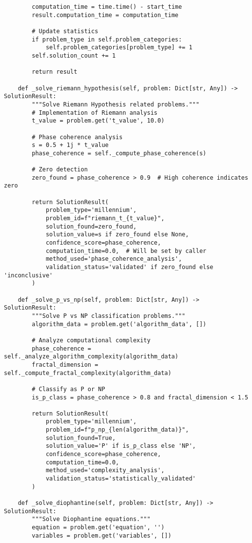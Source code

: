 \documentclass[12pt]{article}
\begin{document}
\begin{lstlisting}
        computation_time = time.time() - start_time
        result.computation_time = computation_time

        # Update statistics
        if problem_type in self.problem_categories:
            self.problem_categories[problem_type] += 1
        self.solution_count += 1

        return result

    def _solve_riemann_hypothesis(self, problem: Dict[str, Any]) -> SolutionResult:
        """Solve Riemann Hypothesis related problems."""
        # Implementation of Riemann analysis
        t_value = problem.get('t_value', 10.0)

        # Phase coherence analysis
        s = 0.5 + 1j * t_value
        phase_coherence = self._compute_phase_coherence(s)

        # Zero detection
        zero_found = phase_coherence > 0.9  # High coherence indicates zero

        return SolutionResult(
            problem_type='millennium',
            problem_id=f"riemann_t_{t_value}",
            solution_found=zero_found,
            solution_value=s if zero_found else None,
            confidence_score=phase_coherence,
            computation_time=0.0,  # Will be set by caller
            method_used='phase_coherence_analysis',
            validation_status='validated' if zero_found else 'inconclusive'
        )

    def _solve_p_vs_np(self, problem: Dict[str, Any]) -> SolutionResult:
        """Solve P vs NP classification problems."""
        algorithm_data = problem.get('algorithm_data', [])

        # Analyze computational complexity
        phase_coherence = self._analyze_algorithm_complexity(algorithm_data)
        fractal_dimension = self._compute_fractal_complexity(algorithm_data)

        # Classify as P or NP
        is_p_class = phase_coherence > 0.8 and fractal_dimension < 1.5

        return SolutionResult(
            problem_type='millennium',
            problem_id=f"p_np_{len(algorithm_data)}",
            solution_found=True,
            solution_value='P' if is_p_class else 'NP',
            confidence_score=phase_coherence,
            computation_time=0.0,
            method_used='complexity_analysis',
            validation_status='statistically_validated'
        )

    def _solve_diophantine(self, problem: Dict[str, Any]) -> SolutionResult:
        """Solve Diophantine equations."""
        equation = problem.get('equation', '')
        variables = problem.get('variables', [])


\end{lstlisting}
\end{document}
